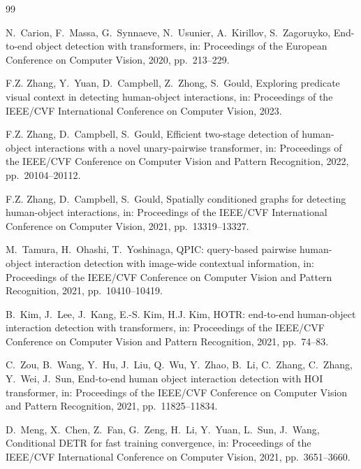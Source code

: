 \documentclass[12pt,a4paper]{article}
\begin{document}
{\small
\begin{thebibliography}{99}\itemsep1pt

N.~Carion, F.~Massa, G.~Synnaeve, N.~Usunier, A.~Kirillov, S.~Zagoruyko, End-to-end object detection with transformers, in: Proceedings of the European Conference on Computer Vision, 2020, pp.~213--229.

F.Z. Zhang, Y.~Yuan, D.~Campbell, Z.~Zhong, S.~Gould, Exploring predicate visual context in detecting human-object interactions, in: Proceedings of the IEEE/CVF International Conference on Computer Vision, 2023.

F.Z. Zhang, D.~Campbell, S.~Gould, Efficient two-stage detection of human-object interactions with a novel unary-pairwise transformer, in: Proceedings of the IEEE/CVF Conference on Computer Vision and Pattern Recognition, 2022, pp.~20104--20112.

F.Z. Zhang, D.~Campbell, S.~Gould, Spatially conditioned graphs for detecting human-object interactions, in: Proceedings of the IEEE/CVF International Conference on Computer Vision, 2021, pp.~13319--13327.

M.~Tamura, H.~Ohashi, T.~Yoshinaga, QPIC: query-based pairwise human-object interaction detection with image-wide contextual information, in: Proceedings of the IEEE/CVF Conference on Computer Vision and Pattern Recognition, 2021, pp.~10410--10419.

B.~Kim, J.~Lee, J.~Kang, E.-S. Kim, H.J. Kim, HOTR: end-to-end human-object interaction detection with transformers, in: Proceedings of the IEEE/CVF Conference on Computer Vision and Pattern Recognition, 2021, pp.~74--83.

C.~Zou, B.~Wang, Y.~Hu, J.~Liu, Q.~Wu, Y.~Zhao, B.~Li, C.~Zhang, C.~Zhang, Y.~Wei, J.~Sun, End-to-end human object interaction detection with HOI transformer, in: Proceedings of the IEEE/CVF Conference on Computer Vision and Pattern Recognition, 2021, pp.~11825--11834.

D.~Meng, X.~Chen, Z.~Fan, G.~Zeng, H.~Li, Y.~Yuan, L.~Sun, J.~Wang, Conditional DETR for fast training convergence, in: Proceedings of the IEEE/CVF International Conference on Computer Vision, 2021, pp.~3651--3660.


\end{thebibliography}}
\end{document}
